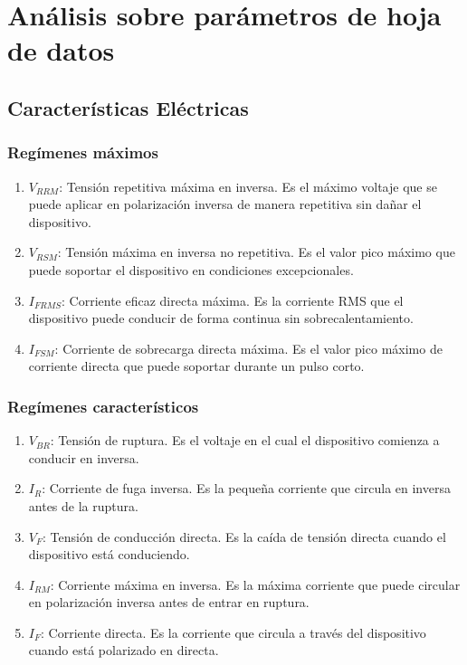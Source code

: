 \documentclass[chaptersright]{informeutn}
\begin{document}
\chapter{Análisis sobre parámetros de hoja de datos}

  \section*{Características Eléctricas}
  
    \subsection*{Regímenes máximos}
      \begin{enumerate}
        \item $V_{RRM}$: Tensión repetitiva máxima en inversa. Es el máximo voltaje que se puede aplicar en polarización inversa de manera repetitiva sin dañar el dispositivo.
        \item $V_{RSM}$: Tensión máxima en inversa no repetitiva. Es el valor pico máximo que puede soportar el dispositivo en condiciones excepcionales.
        \item $I_{FRMS}$: Corriente eficaz directa máxima. Es la corriente RMS que el dispositivo puede conducir de forma continua sin sobrecalentamiento.
        \item $I_{FSM}$: Corriente de sobrecarga directa máxima. Es el valor pico máximo de corriente directa que puede soportar durante un pulso corto.
      \end{enumerate}
    
    \subsection*{Regímenes característicos}
      \begin{enumerate}
        \item $V_{BR}$: Tensión de ruptura. Es el voltaje en el cual el dispositivo comienza a conducir en inversa.
        \item $I_R$: Corriente de fuga inversa. Es la pequeña corriente que circula en inversa antes de la ruptura.
        \item $V_F$: Tensión de conducción directa. Es la caída de tensión directa cuando el dispositivo está conduciendo.
        \item $I_{RM}$: Corriente máxima en inversa. Es la máxima corriente que puede circular en polarización inversa antes de entrar en ruptura.
        \item $I_F$: Corriente directa. Es la corriente que circula a través del dispositivo cuando está polarizado en directa.
      \end{enumerate}
  
\end{document}
